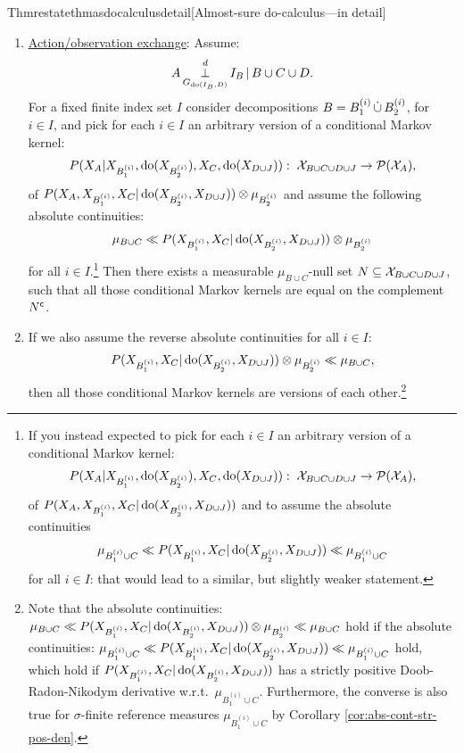 \begin{restatable}{Thm}{restatethmasdocalculusdetail}[Almost-sure do-calculus---in detail]
\begin{enumerate}
\item \underline{Action/observation exchange}: Assume:
            \[ A \operatorname*{\perp}^d_{G_{\operatorname{do}(I_B,D)}} I_B \operatorname*{|} B \cup C \cup D.   \]
            For a fixed finite index set $I$ consider decompositions
            $B=B_1^{(i)} \,\dot{\cup}\, B_2^{(i)}$, for $i \in I$,
            and pick for each $i \in I$ an arbitrary version of a conditional Markov kernel:
            \[ P(X_A|X_{B_1^{(i)}},\operatorname{do}(X_{B_2^{(i)}}),X_C,\operatorname{do}(X_{D\cup J})): 
            \;\mathcal{X}_{B \cup C \cup D \cup J} \to \mathcal{P}(\mathcal{X}_A), \]
            of $P(X_A,X_{B_1^{(i)}},X_C|\operatorname{do}(X_{B_2^{(i)}},X_{D\cup J})) \otimes \mu_{B_2^{(i)}}$ 
            and assume the following absolute continuities:
            \[ \mu_{B \cup C} \ll  P(X_{B_1^{(i)}},X_C|\operatorname{do}(X_{B_2^{(i)}},X_{D\cup J})) \otimes \mu_{B_2^{(i)}} \]
            for all $i \in I$.\footnote{If you instead expected to pick for each $i \in I$ an arbitrary version of a conditional Markov kernel:
            \[ P(X_A|X_{B_1^{(i)}},\operatorname{do}(X_{B_2^{(i)}}),X_C,\operatorname{do}(X_{D\cup J})): \;\mathcal{X}_{B \cup C \cup D \cup J} \to \mathcal{P}(\mathcal{X}_A), \]
            of $P(X_A,X_{B_1^{(i)}},X_C|\operatorname{do}(X_{B_2^{(i)}},X_{D\cup J}))$ and to assume the absolute continuities
            \[ \mu_{B_1^{(i)} \cup C} \ll  P(X_{B_1^{(i)}},X_C|\operatorname{do}(X_{B_2^{(i)}},X_{D\cup J})) \ll \mu_{B_1^{(i)} \cup C} \]
            for all $i \in I$: that would lead to a similar, but slightly weaker statement.}
        Then there exists a measurable $\mu_{B \cup C}$-null set
        $N \subseteq \mathcal{X}_{B \cup C \cup D \cup J}$,
        such that all those conditional Markov kernels are equal on the complement $N^{\mathsf{c}}$.
      \item[] If we also assume the reverse absolute continuities for all $i \in I$:
         \[  P(X_{B_1^{(i)}},X_C|\operatorname{do}(X_{B_2^{(i)}},X_{D\cup J})) \otimes \mu_{B_2^{(i)}} \ll \mu_{B \cup C}, \]
         then all those conditional Markov kernels are versions of each other.\footnote{Note that the absolute continuities: $ \mu_{B \cup C} \ll P(X_{B_1^{(i)}},X_C|\operatorname{do}(X_{B_2^{(i)}},X_{D\cup J})) \otimes \mu_{B_2^{(i)}} \ll \mu_{B \cup C} $ hold if the absolute continuities: $\mu_{B_1^{(i)} \cup C} \ll P(X_{B_1^{(i)}},X_C|\operatorname{do}(X_{B_2^{(i)}},X_{D\cup J})) \ll \mu_{B_1^{(i)} \cup C} $ hold, which hold if $P(X_{B_1^{(i)}},X_C|\operatorname{do}(X_{B_2^{(i)}},X_{D\cup J}))$ has a strictly positive Doob-Radon-Nikodym derivative w.r.t.\ $\mu_{B_1^{(i)} \cup C}$. Furthermore, the converse is also true for $\sigma$-finite reference measures $\mu_{B_1^{(i)} \cup C}$ by Corollary \ref{cor:abs-cont-str-pos-den}.}


\end{enumerate}
\end{restatable}
